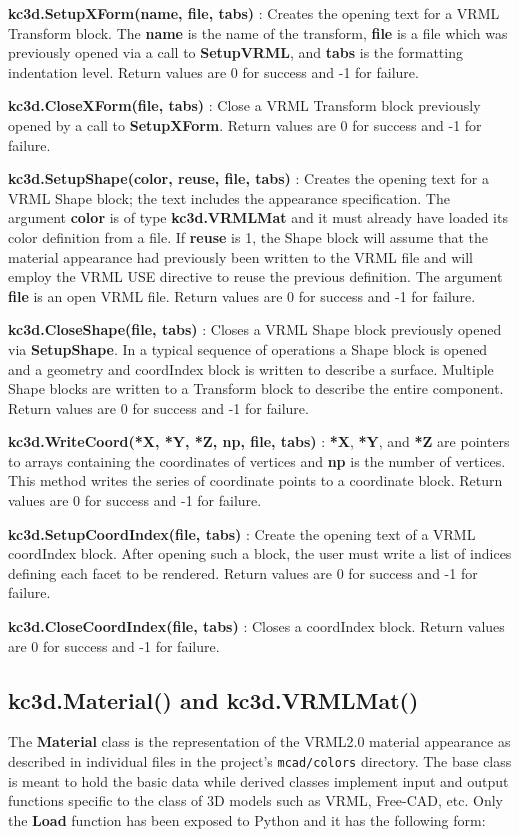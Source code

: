 \textbf{kc3d.SetupXForm(name, file, tabs)} : Creates the opening
text for a VRML Transform block.  The \textbf{name} is the name
of the transform, \textbf{file} is a file which was previously opened
via a call to \textbf{SetupVRML}, and \textbf{tabs} is the
formatting indentation level. Return values are 0 for success and
-1 for failure.

\textbf{kc3d.CloseXForm(file, tabs)} : Close a VRML Transform block previously
opened by a call to \textbf{SetupXForm}. Return values are 0 for
success and -1 for failure.

\textbf{kc3d.SetupShape(color, reuse, file, tabs)} : Creates the
opening text for a VRML Shape block; the text includes the 
appearance specification. The argument \textbf{color} is of
type \textbf{kc3d.VRMLMat} and it must already have loaded its
color definition from a file. If \textbf{reuse} is 1, the
Shape block will assume that the material appearance had
previously been written to the VRML file and will employ the
VRML USE directive to reuse the previous definition.
The argument \textbf{file} is an open VRML file. Return values
are 0 for success and -1 for failure.

\textbf{kc3d.CloseShape(file, tabs)} : Closes a VRML Shape block previously
opened via \textbf{SetupShape}. In a typical sequence of operations
a Shape block is opened and a geometry and coordIndex block is written
to describe a surface. Multiple Shape blocks are written to a
Transform block to describe the entire component. Return values are
0 for success and -1 for failure.

\textbf{kc3d.WriteCoord(*X, *Y, *Z, np, file, tabs)} : \textbf{*X},
\textbf{*Y}, and \textbf{*Z} are pointers to arrays containing the
coordinates of vertices and \textbf{np} is the number of vertices.
This method writes the series of coordinate points to a
coordinate block. Return values are 0 for success and -1 for failure.

\textbf{kc3d.SetupCoordIndex(file, tabs)} : Create the opening text
of a VRML coordIndex block. After opening such a block, the user
must write a list of indices defining each facet to be rendered.
Return values are 0 for success and -1 for failure.

\textbf{kc3d.CloseCoordIndex(file, tabs)} : Closes a coordIndex
block. Return values are 0 for success and -1 for failure.

\subsection{kc3d.Material() and kc3d.VRMLMat()}
The \textbf{Material} class is the representation of the VRML2.0 material
appearance as described in individual files in the project's \verb#mcad/colors#
directory. The base class is meant to hold the basic data while derived classes
implement input and output functions specific to the class of 3D models such
as VRML, Free-CAD, etc. Only the \textbf{Load} function has been exposed to
Python and it has the following form:

